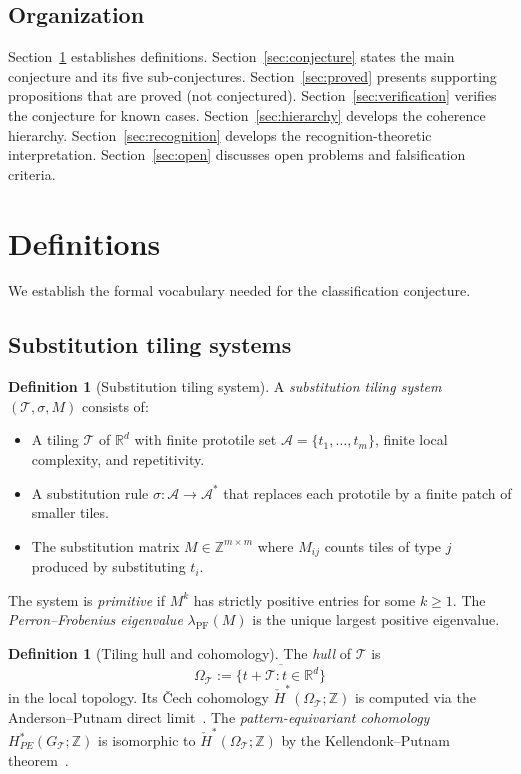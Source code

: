 \documentclass[12pt]{article}
\theoremstyle{definition}
\newtheorem{definition}[theorem]{Definition}
\theoremstyle{remark}
\newcommand{\RR}{\mathbb{R}}
\newcommand{\ZZ}{\mathbb{Z}}
\newcommand{\Hcech}{\check{H}}
\DeclareMathOperator{\PF}{PF}
\begin{document}
\subsection{Organization}

Section~\ref{sec:definitions} establishes definitions. Section~\ref{sec:conjecture} states the main conjecture and its five sub-conjectures. Section~\ref{sec:proved} presents supporting propositions that are proved (not conjectured). Section~\ref{sec:verification} verifies the conjecture for known cases. Section~\ref{sec:hierarchy} develops the coherence hierarchy. Section~\ref{sec:recognition} develops the recognition-theoretic interpretation. Section~\ref{sec:open} discusses open problems and falsification criteria.


\section{Definitions}
\label{sec:definitions}

We establish the formal vocabulary needed for the classification conjecture.

\subsection{Substitution tiling systems}

\begin{definition}[Substitution tiling system]
\label{def:substitution-system}
A \emph{substitution tiling system} $(\mathcal{T}, \sigma, M)$ consists of:
\begin{itemize}
\item A tiling $\mathcal{T}$ of $\RR^d$ with finite prototile set $\mathcal{A} = \{t_1, \ldots, t_m\}$, finite local complexity, and repetitivity.
\item A substitution rule $\sigma: \mathcal{A} \to \mathcal{A}^*$ that replaces each prototile by a finite patch of smaller tiles.
\item The substitution matrix $M \in \ZZ^{m \times m}$ where $M_{ij}$ counts tiles of type $j$ produced by substituting $t_i$.
\end{itemize}
The system is \emph{primitive} if $M^k$ has strictly positive entries for some $k \geq 1$. The \emph{Perron--Frobenius eigenvalue} $\lambda_\PF(M)$ is the unique largest positive eigenvalue.
\end{definition}

\begin{definition}[Tiling hull and cohomology]
The \emph{hull} of $\mathcal{T}$ is
\[
\Omega_{\mathcal{T}} := \overline{\{t + \mathcal{T} : t \in \RR^d\}}
\]
in the local topology. Its \v{C}ech cohomology $\Hcech^*(\Omega_{\mathcal{T}}; \ZZ)$ is computed via the Anderson--Putnam direct limit~\cite{AndersonPutnam1998}. The \emph{pattern-equivariant cohomology} $H^*_{PE}(G_{\mathcal{T}}; \ZZ)$ is isomorphic to $\Hcech^*(\Omega_{\mathcal{T}}; \ZZ)$ by the Kellendonk--Putnam theorem~\cite{KellendonkPutnam2006}.
\end{definition}
\end{document}
